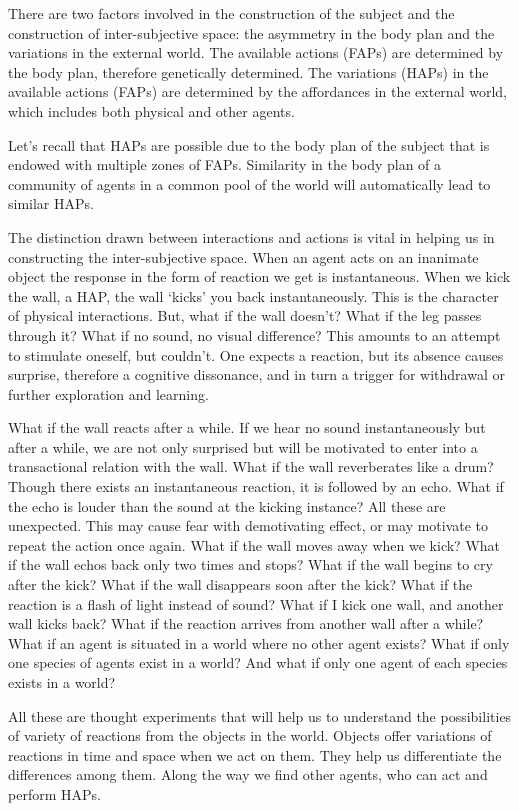 There are two factors involved in the construction of the subject and the construction of inter-subjective space: the asymmetry in the body plan and the variations in the external world. The available actions (FAPs) are determined by the body plan, therefore genetically determined. The variations (HAPs) in the available actions (FAPs) are determined by the affordances in the external world, which includes both physical and other agents. 

Let's recall that HAPs are possible due to the body plan of the subject that is endowed with multiple zones of FAPs. Similarity in the body plan of a community of agents in a common pool of the world will automatically lead to similar HAPs. 

The distinction drawn between interactions and actions is vital in helping us in constructing the inter-subjective space. When an agent acts on an inanimate object the response in the form of reaction we get is instantaneous. When we kick the wall, a HAP, the wall `kicks' you back instantaneously. This is the character of physical interactions.  But, what if the wall doesn't? What if the leg passes through it? What if no sound, no visual difference?  This amounts to an attempt to stimulate oneself, but couldn't. One expects a reaction, but its absence causes surprise, therefore a cognitive dissonance, and in turn a trigger for withdrawal or further exploration and learning. 

What if the wall reacts after a while. If we hear no sound instantaneously but after a while, we are not only surprised but will be motivated to enter into a transactional relation with the wall. What if the wall reverberates like a drum? Though there exists an instantaneous reaction, it is followed by an echo.  What if the echo is louder than the sound at the kicking instance? All these are unexpected. This may cause fear with demotivating effect, or may motivate to repeat the action once again. What if the wall moves away when we kick? What if the wall echos back only two times and stops? What if the wall begins to cry after the kick? What if the wall disappears soon after the kick? What if the reaction is a flash of light instead of sound? What if I kick one wall, and another wall kicks back? What if the reaction arrives from another wall after a while? What if an agent is situated in a world where no other agent exists? What if only one species of agents exist in a world? And what if only one agent of each species exists in a world? 

All these are thought experiments that will help us to understand the possibilities of variety of reactions from the objects in the world. Objects offer variations of reactions in time and space when we act on them. They help us differentiate the differences among them. Along the way we find other agents, who can act and perform HAPs. 


